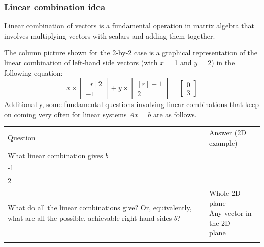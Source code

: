 \documentclass[../main.tex]{subfiles}
\begin{document}
\subsubsection{Linear combination idea}
Linear combination of vectors is a fundamental operation in matrix algebra that involves multiplying vectors with scalars and adding them together. \vspace{0.5em}

The column picture shown for the 2-by-2 case is a graphical representation of the linear combination of left-hand side vectors (with \(x\) = 1 and \(y\) = 2) in the following equation:
\[
    x \times
    \begin{bmatrix*}[r]
        2 \\
        -1
    \end{bmatrix*}
    +
    y \times
    \begin{bmatrix*}[r]
        -1 \\
        2
    \end{bmatrix*}
    =
    \begin{bmatrix*}
        0 \\
        3
    \end{bmatrix*}
\]
Additionally, some fundamental questions involving linear combinations that keep on coming very often for linear systems \(Ax = b\) are as follows.

\begin{tabular}{@{}ll@{}}
    \trule
    \textrm{Question}                   & \textrm{Answer (2D example)} \\
    \mrule
    What linear combination gives \(b\) &
    \(
    1 \times
    \begin{bmatrix*}[r]
        2 \\
        -1
    \end{bmatrix*}
    +
    2 \times
    \begin{bmatrix*}[r]
        -1 \\
        2
    \end{bmatrix*}
    \)                                                                 \\
    \makecell{What do all the linear combinations give?                \\[0.5em] Or, equivalently, what are all the possible, \\ achievable right-hand sides \(b\)?} & \makecell{Whole 2D plane \\[0.5em] Any vector in the 2D \\ plane} \\
    \brule
\end{tabular}
\end{document}
